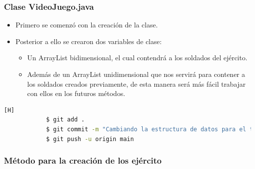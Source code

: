 \documentclass{article}
\begin{document}
        
        \subsubsection{Clase VideoJuego.java}

        \begin{itemize}
            \item Primero se comenzó con la creación de la clase. 
            \item Posterior a ello se crearon dos variables de clase: 
            \begin{itemize}
                \item Un ArrayList bidimensional, el cual contendrá a los soldados del ejército.
                \item Además de un ArrayList unidimensional que nos servirá para contener a los soldados creados previamente, de esta manera será más fácil trabajar con ellos en los futuros métodos.
            \end{itemize}
        \end{itemize}

        

        \begin{lstlisting}[language=bash,caption={Commit \href{https://github.com/hernanchoquehuanca/fp2-23b/commit/a43020e7ffdcd7aca45a9bd5bcc58bf90ce02059}{a43020e} - \href{https://github.com/hernanchoquehuanca/fp2-23b/commit/a9e7076e698a58a62ad7f89cd6c64a6f778b95e7}{a9e7076}: En el segundo commit se modificaba las variables de la clase VideoJuego4.java para utilizar las más adecuadas, luego más adelante se optó por utilizar ArrayList}][H]
    		$ git add .
    		$ git commit -m "Cambiando la estructura de datos para el tablero, se utilizara un arreglo bidimensional de soldados, el cual sera una variable de la clase VideoJuego4.java"			
    		$ git push -u origin main
    	\end{lstlisting}
     
        \subsubsection{Método para la creación de los ejército}
\end{document}

